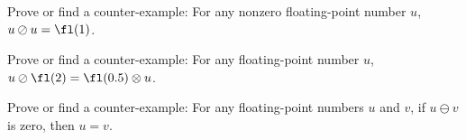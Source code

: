 \begin{xca}
  Prove or find a counter-example:
  For any nonzero floating-point number $u$, $u\oslash u = \fl(1)$.
\end{xca}

\begin{xca}
  Prove or find a counter-example:
  For any floating-point number $u$, $u\oslash\fl(2) = \fl(0.5)\otimes u$.
\end{xca}

\begin{xca}
  Prove or find a counter-example:
  For any floating-point numbers $u$ and $v$,
  if $u\ominus v$ is zero, then $u=v$.
\end{xca}

